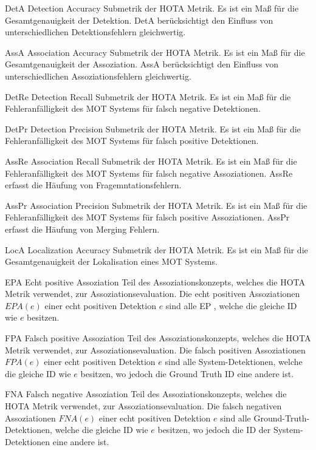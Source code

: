 \newglossaryentrywithacronym
{DetA}
{Detection Accuracy}
{Submetrik der HOTA Metrik. Es ist ein Maß für die Gesamtgenauigkeit der Detektion. DetA berücksichtigt den Einfluss von unterschiedlichen Detektionsfehlern gleichwertig.}

\newglossaryentrywithacronym
{AssA}
{Association Accuracy}
{Submetrik der HOTA Metrik. Es ist ein Maß für die Gesamtgenauigkeit der Assoziation. AssA berücksichtigt den Einfluss von unterschiedlichen Assoziationsfehlern gleichwertig.}

\newglossaryentrywithacronym
{DetRe}
{Detection Recall}
{Submetrik der HOTA Metrik. Es ist ein Maß für die Fehleranfälligkeit des MOT Systems für falsch negative Detektionen.}

\newglossaryentrywithacronym
{DetPr}
{Detection Precision}
{Submetrik der HOTA Metrik. Es ist ein Maß für die Fehleranfälligkeit des MOT Systems für falsch positive Detektionen.}

\newglossaryentrywithacronym
{AssRe}
{Association Recall}
{Submetrik der HOTA Metrik. Es ist ein Maß für die Fehleranfälligkeit des MOT Systems für falsch negative Assoziationen. AssRe erfasst die Häufung von Fragemntationsfehlern.}

\newglossaryentrywithacronym
{AssPr}
{Association Precision}
{Submetrik der HOTA Metrik. Es ist ein Maß für die Fehleranfälligkeit des MOT Systems für falsch positive Assoziationen. AssPr erfasst die Häufung von Merging Fehlern.}

\newglossaryentrywithacronym
{LocA}
{Localization Accuracy}
{Submetrik der HOTA Metrik. Es ist ein Maß für die Gesamtgenauigkeit der Lokalisation eines MOT Systems.}

\newglossaryentrywithacronym
{EPA}
{Echt positive Assoziation}
{Teil des Assoziationskonzepts, welches die HOTA Metrik verwendet, zur Assoziationsevaluation. Die echt positiven Assoziationen \(EPA(e)\) einer echt positiven Detektion \(e\) sind alle EP , welche die gleiche ID wie \(e\) besitzen.}

\newglossaryentrywithacronym
{FPA}
{Falsch positive Assoziation}
{Teil des Assoziationskonzepts, welches die HOTA Metrik verwendet, zur Assoziationsevaluation. Die falsch positiven Assoziationen \(FPA(e)\) einer echt positiven Detektion \(e\) sind alle System-Detektionen, welche die gleiche ID wie \(e\) besitzen, wo jedoch die Ground Truth ID eine andere ist.}

\newglossaryentrywithacronym
{FNA}
{Falsch negative Assoziation}
{Teil des Assoziationskonzepts, welches die HOTA Metrik verwendet, zur Assoziationsevaluation. Die falsch negativen Assoziationen \(FNA(e)\) einer echt positiven Detektion \(e\) sind alle  Ground-Truth-Detektionen, welche die gleiche ID wie \(e\) besitzen, wo jedoch die ID der System-Detektionen eine andere ist.}

